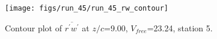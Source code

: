 \begin{figure}[H]
\centering
\texttt{[image: figs/run\_45/run\_45\_rw\_contour]}
\caption{Contour plot of $\overline{r^\prime w^\prime}$ at $z/c$=9.00, $V_{free}$=23.24, station 5.}
\label{fig:run_45_rw_contour}
\end{figure}


